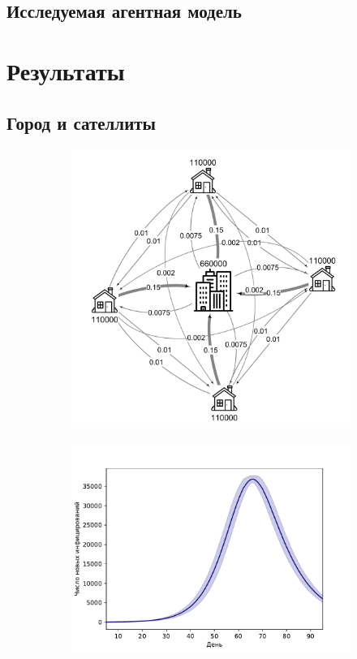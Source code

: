 \documentclass[a4paper,12pt]{article} %
\begin{document}
\subsection{Исследуемая агентная модель}
\section{Результаты}
\subsection{Город и сателлиты}

\begin{figure}[H]
    \centering
    \begin{subfigure}{0.45\linewidth}
        \centering
        \includegraphics[width=\linewidth]{images/graph1.png}
    \end{subfigure}
    \hfill
    \begin{subfigure}{0.5\linewidth}
        \centering
        \includegraphics[width=\linewidth]{images/epid.pdf}

\end{subfigure}
\end{figure}
\end{document}
